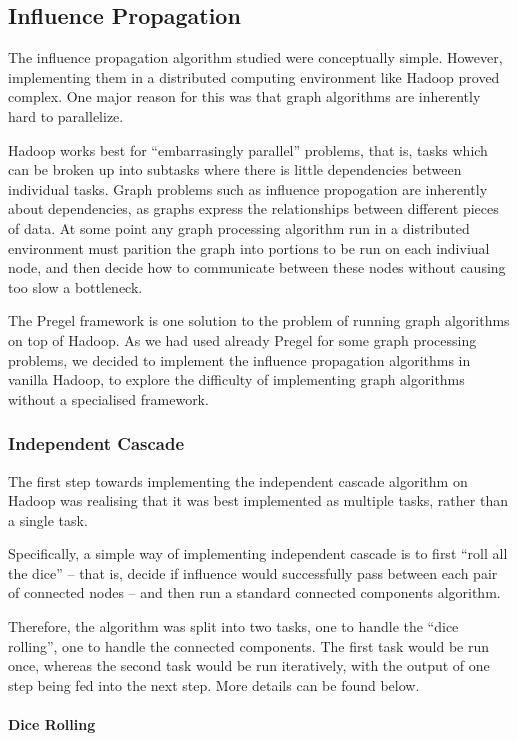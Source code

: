 \subsection{Influence Propagation}

The influence propagation algorithm studied were conceptually simple. However, implementing them in a distributed computing environment like Hadoop proved complex. One major reason for this was that graph algorithms are inherently hard to parallelize. 

Hadoop works best for ``embarrasingly parallel'' problems, that is, tasks which can be broken up into subtasks where there is little dependencies between individual tasks. Graph problems such as influence propogation are inherently about dependencies, as graphs express the relationships between different pieces of data. At some point any graph processing algorithm run in a distributed environment must parition the graph into portions to be run on each indiviual node, and then decide how to communicate between these nodes without causing too slow a bottleneck.

The Pregel framework is one solution to the problem of running graph algorithms on top of Hadoop. As we had used already Pregel for some graph processing problems, we decided to implement the influence propagation algorithms in vanilla Hadoop, to explore the difficulty of implementing graph algorithms without a specialised framework.

\subsubsection{Independent Cascade}

The first step towards implementing the independent cascade algorithm on Hadoop was realising that it was best implemented as multiple tasks, rather than a single task.

Specifically, a simple way of implementing independent cascade is to first ``roll all the dice'' -- that is, decide if influence would successfully pass between each pair of connected nodes -- and then run a standard connected components algorithm.

Therefore, the algorithm was split into two tasks, one to handle the ``dice rolling'', one to handle the connected components. The first task would be run once, whereas the second task would be run iteratively, with the output of one step being fed into the next step. More details can be found below.

\paragraph{Dice Rolling}


